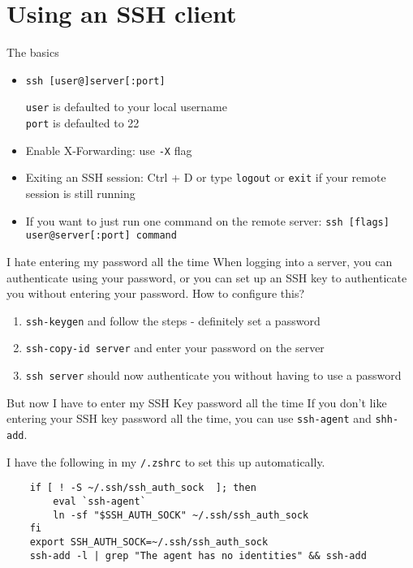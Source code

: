 \documentclass{lug}
\newcommand{\textapprox}{\raisebox{0.5ex}{\texttildelow}}
\begin{document}
\section{Using an SSH client}
\begin{frame}{The basics}
    \begin{itemize}[<+->]
        \item \texttt{ssh [user@]server[:port]}

            \texttt{user} is defaulted to your local username\\
            \texttt{port} is defaulted to 22
        \item Enable X-Forwarding: use \texttt{-X} flag
        \item Exiting an SSH session: Ctrl + D or type \texttt{logout} or
            \texttt{exit} if your remote session is still running
        \item If you want to just run one command on the remote server:
            \texttt{ssh [flags] user@server[:port] command}
    \end{itemize}
\end{frame}

\begin{frame}{I hate entering my password all the time}
    When logging into a server, you can authenticate using your password, or you
    can set up an SSH key to authenticate you without entering your password.
    How to configure this?
    \begin{enumerate}
        \item \texttt{ssh-keygen} and follow the steps - definitely set a
            password
        \item \texttt{ssh-copy-id server} and enter your password on the server
        \item \texttt{ssh server} should now authenticate you without having to
            use a password
    \end{enumerate}
\end{frame}

\begin{frame}[fragile]{But now I have to enter my SSH Key password all the time}
    If you don't like entering your SSH key password all the time, you can use
    \texttt{ssh-agent} and \texttt{shh-add}.

    I have the following in my \texttt{\textapprox/.zshrc} to set this up
    automatically.

    \begin{verbatim}
    if [ ! -S ~/.ssh/ssh_auth_sock  ]; then
        eval `ssh-agent`
        ln -sf "$SSH_AUTH_SOCK" ~/.ssh/ssh_auth_sock
    fi
    export SSH_AUTH_SOCK=~/.ssh/ssh_auth_sock
    ssh-add -l | grep "The agent has no identities" && ssh-add
    \end{verbatim}
\end{frame}
\end{document}
